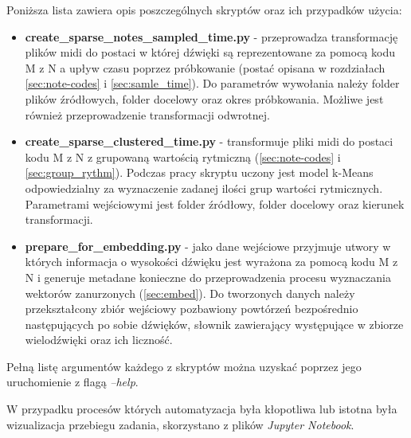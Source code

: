{{        Poniższa lista zawiera opis poszczególnych skryptów oraz ich przypadków użycia:
        \begin{itemize}
            \setlength\itemsep{-0.5em}
            \item {\textbf {create\_sparse\_notes\_sampled\_time.py}} - przeprowadza transformację plików midi do postaci w której dźwięki są reprezentowane za pomocą kodu M\,\,z\,\,N a upływ czasu poprzez próbkowanie (postać opisana w rozdziałach \ref{sec:note-codes} i \ref{sec:samle_time}). Do parametrów wywołania należy folder plików źródłowych, folder docelowy oraz okres próbkowania. Możliwe jest również przeprowadzenie transformacji odwrotnej.
            \item {\textbf {create\_sparse\_clustered\_time.py}} - transformuje pliki midi do postaci kodu M\,\,z\,\,N z grupowaną wartością rytmiczną (\ref{sec:note-codes} i \ref{sec:group_rythm}). Podczas pracy skryptu uczony jest model k-Means odpowiedzialny za wyznaczenie zadanej ilości grup wartości rytmicznych. Parametrami wejściowymi jest folder źródłowy, folder docelowy oraz kierunek transformacji.
            \item {\textbf {prepare\_for\_embedding.py}} - jako dane wejściowe przyjmuje utwory w których informacja o wysokości dźwięku jest wyrażona za pomocą kodu M\,\,z\,\,N i generuje metadane konieczne do przeprowadzenia procesu wyznaczania wektorów zanurzonych (\ref{sec:embed}). Do tworzonych danych należy przekształcony zbiór wejściowy pozbawiony powtórzeń bezpośrednio następujących po sobie dźwięków, słownik zawierający występujące w zbiorze wielodźwięki oraz ich liczność. 
        \end{itemize} 

        Pełną listę argumentów każdego z skryptów można uzyskać poprzez jego uruchomienie z flagą {\textit {--help}}.

        W przypadku procesów których automatyzacja była kłopotliwa lub istotna była wizualizacja przebiegu zadania, skorzystano z plików {\textit {Jupyter Notebook}}.

}}
